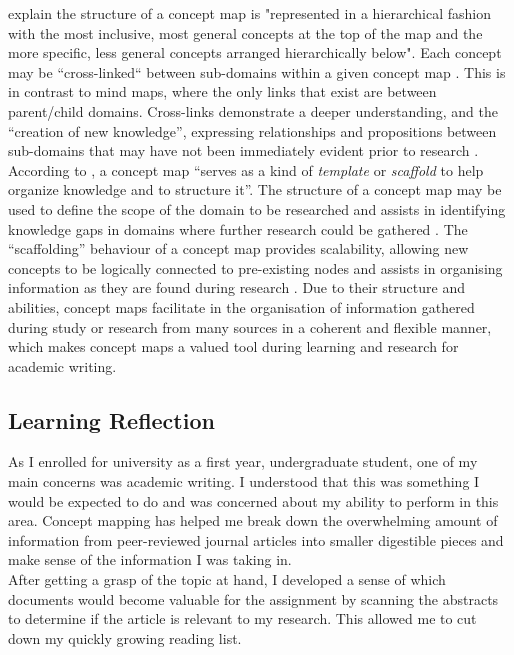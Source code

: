 \documentclass[12pt,a4paper]{report}
\begin{document}
\citet[pp. 1]{Novak2006} explain the structure of a concept map is "represented in a hierarchical fashion with the most inclusive, most general concepts at the top of the map and the more specific, less general concepts arranged hierarchically below". Each concept may be ``cross-linked`` between sub-domains within a given concept map \citep{Novak2006}. This is in contrast to mind maps, where the only links that exist are between parent/child domains. Cross-links demonstrate a deeper understanding, and the ``creation of new knowledge'', expressing relationships and propositions between sub-domains that may have not been immediately evident prior to research \citep{Novak2006}.\\

According to \citet[pp.1]{Novak2006}, a concept map ``serves as a kind of \emph{template} or \emph{scaffold} to help organize knowledge and to structure it''. The structure of a concept map may be used to define the scope of the domain to be researched and assists in identifying knowledge gaps in domains where further research could be gathered \citep{Novak2006}. The ``scaffolding'' behaviour of a concept map provides scalability, allowing new concepts to be logically connected to pre-existing nodes and assists in organising information as they are found during research \citep{Novak2006}. Due to their structure and abilities, concept maps facilitate in the organisation of information gathered during study or research from many sources in a coherent and flexible manner, which makes concept maps a valued tool during learning and research for academic writing.

\newpage
\subsection*{\textsf{Learning Reflection}}
As I enrolled for university as a first year, undergraduate student, one of my main concerns was academic writing. I understood that this was something I would be expected to do and was concerned about my ability to perform in this area. Concept mapping has helped me break down the overwhelming amount of information from peer-reviewed journal articles into smaller digestible pieces and make sense of the information I was taking in.\\

After getting a grasp of the topic at hand, I developed a sense of which documents would become valuable for the assignment by scanning the abstracts to determine if the article is relevant to my research. This allowed me to cut down my quickly growing reading list.\\
\end{document}

